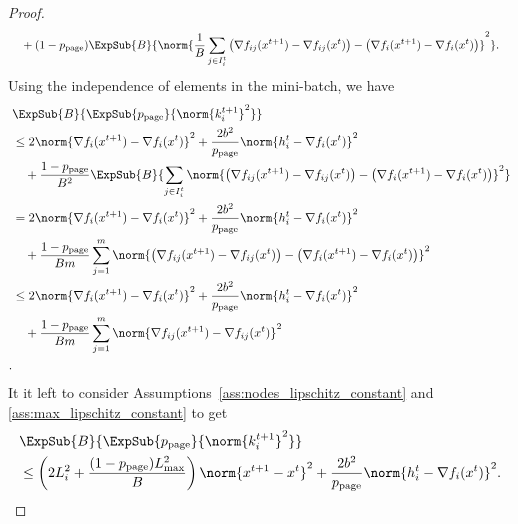 \documentclass{article}
\newcommand*{\probpage}{\ensuremath{p_{\text{page}}}}
\begin{document}
\begin{proof}
\begin{align*}
    &\quad + (1 - \probpage) \ExpSub{B}{\norm{\frac{1}{B}\sum_{j \in I^t_i}\left(\nabla f_{ij}(x^{t+1}) - \nabla f_{ij}(x^{t})\right) - \left(\nabla f_{i}(x^{t+1}) - \nabla f_{i}(x^{t})\right)}^2}.
  \end{align*}
  Using the independence of elements in the mini-batch, we have
  \begin{align*}
    &\ExpSub{B}{\ExpSub{\probpage}{\norm{k^{t+1}_i}^2}} \\
    &\leq 2 \norm{\nabla f_i(x^{t+1}) - \nabla f_i(x^{t})}^2 +  \frac{2b^2}{\probpage} \norm{h^t_i - \nabla f_i(x^{t})}^2 \\
    &\quad + \frac{1 - \probpage}{B^2} \ExpSub{B}{\sum_{j \in I^t_i}\norm{\left(\nabla f_{ij}(x^{t+1}) - \nabla f_{ij}(x^{t})\right) - \left(\nabla f_{i}(x^{t+1}) - \nabla f_{i}(x^{t})\right)}^2} \\ 
    &= 2 \norm{\nabla f_i(x^{t+1}) - \nabla f_i(x^{t})}^2 +  \frac{2b^2}{\probpage} \norm{h^t_i - \nabla f_i(x^{t})}^2 \\
    &\quad + \frac{1 - \probpage}{B m} \sum_{j=1}^m \norm{\left(\nabla f_{ij}(x^{t+1}) - \nabla f_{ij}(x^{t})\right) - \left(\nabla f_{i}(x^{t+1}) - \nabla f_{i}(x^{t})\right)}^2 \\ 
    &\leq 2 \norm{\nabla f_i(x^{t+1}) - \nabla f_i(x^{t})}^2 +  \frac{2b^2}{\probpage} \norm{h^t_i - \nabla f_i(x^{t})}^2 \\
    &\quad + \frac{1 - \probpage}{B m} \sum_{j=1}^m \norm{\nabla f_{ij}(x^{t+1}) - \nabla f_{ij}(x^{t})}^2 \\.
  \end{align*}
  It it left to consider Assumptions~\ref{ass:nodes_lipschitz_constant} and \ref{ass:max_lipschitz_constant} to get
  \begin{align*}
    &\ExpSub{B}{\ExpSub{\probpage}{\norm{k^{t+1}_i}^2}} \\
    &\leq \left(2 L_i^2 + \frac{(1 - \probpage)L_{\max}^2}{B}\right)\norm{x^{t+1} - x^{t}}^2 +  \frac{2b^2}{\probpage} \norm{h^t_i - \nabla f_i(x^{t})}^2.
  \end{align*}
\end{proof}

\CONVERGENCEPAGE*
\end{document}
